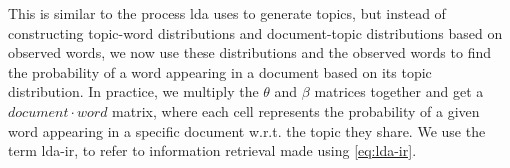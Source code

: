 This is similar to the process \gls{lda} uses to generate topics, but instead of constructing topic-word distributions and document-topic distributions based on observed words, we now use these distributions and the observed words to find the probability of a word appearing in a document based on its topic distribution.
In practice, we multiply the $\theta$ and $\beta$ matrices together and get a $document \cdot word$ matrix, where each cell represents the probability of a given word appearing in a specific document w.r.t. the topic they share.
We use the term \gls{lda}-\gls{ir}, to refer to information retrieval made using \autoref{eq:lda-ir}.
